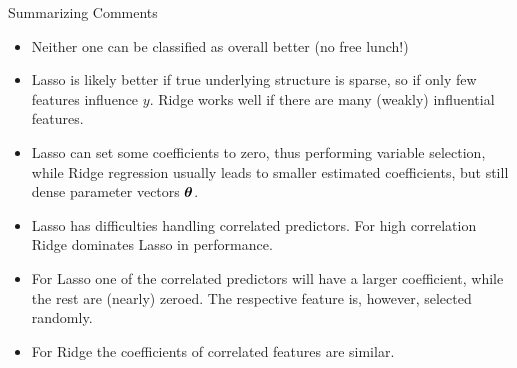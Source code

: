 \documentclass[11pt,compress,t,notes=noshow, xcolor=table]{beamer}
\begin{document}
\begin{vbframe}{Summarizing Comments}

\begin{itemize}
\item Neither one can be classified as overall better (no free lunch!)
\item Lasso is likely better if true underlying structure is sparse, so if only few features influence $y$. Ridge works well if there are many (weakly) influential features.
\item Lasso can set some coefficients to zero, thus performing variable selection, while Ridge regression usually leads to smaller estimated coefficients, but still dense parameter vectors $\bm{\theta}$.
\item Lasso has difficulties handling correlated predictors. For high correlation Ridge dominates Lasso in performance.
\item For Lasso one of the correlated predictors will have a larger coefficient, while the rest are (nearly) zeroed. The respective feature is, however, selected randomly. 
\item For Ridge the coefficients of correlated features are similar.
\end{itemize}

\end{vbframe}

\endlecture
\end{document}
